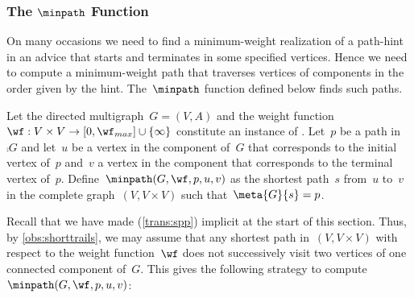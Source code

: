\subsubsection{The $\minpath$ Function}
On many occasions we need to find a minimum-weight realization of a path-hint in an advice that starts and terminates in some specified vertices. Hence we need to compute a minimum-weight path that traverses vertices of components in the order given by the hint. The~$\minpath$ function defined below finds such paths.
\begin{definition}\label{def:minpath}
  Let the directed multigraph~$G=(V,A)$ and the weight function~$\wf: V \times V \rightarrow [0, \wf_{max}]\cup \{\infty\}$ constitute an instance of \pWMEEs{}. Let~$p$ be a path in~$\comp{G}$ and let~$u$ be a vertex in the component of~$G$ that corresponds to the initial vertex of~$p$ and~$v$ a vertex in the component that corresponds to the terminal vertex of~$p$. Define~$\minpath(G,\wf, p, u, v)$ as the shortest path~$s$ from~$u$ to~$v$ in the complete graph~$(V, V \times V)$ such that~$\meta{G}{s} = p$.
\end{definition} Recall that we have made \SPP{} (\autoref{trans:spp}) implicit at the start of this section. Thus, by \autoref{obs:shorttrails}, we may assume that any shortest path in~$(V, V \times V)$ with respect to the weight function~$\wf$ does not successively visit two vertices of one connected component of~$G$. This gives the following strategy to compute $\minpath(G, \wf, p, u, v)$:

